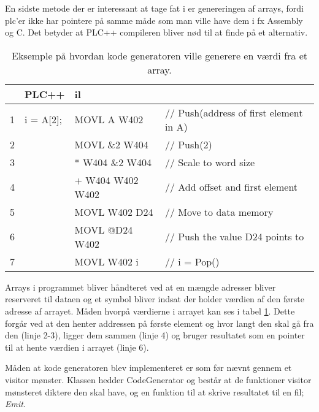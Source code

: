 {

En sidste metode der er interessant at tage fat i er genereringen af arrays, fordi \gls{plc}'er ikke har pointere på samme måde som man ville have dem i fx Assembly og C. Det betyder at PLC++ compileren bliver nød til at finde på et alternativ.

\begin{table}[h]
    \centering\ttfamily
    \begin{tabular}{l|l|l l}
         &PLC++       & \gls{il} \\\hline
        1&i = A[2];   & MOVL A W402       &// Push(address of first element in A)\\
        2&            & MOVL \&2 W404     &// Push(2)\\
        3&            & * W404 \&2 W404   &// Scale to word size\\
        4&            & + W404 W402 W402  &// Add offset and first element\\
        5&            & MOVL W402 D24     &// Move to data memory\\
        6&            & MOVL @D24 W402    &// Push the value D24 points to\\
        7&            & MOVL W402 i       &// i = Pop()
    \end{tabular}
    \caption{Eksemple på hvordan kode generatoren ville generere en værdi fra et array.}
    \label{tab:codegenArray}
\end{table}

Arrays i programmet bliver håndteret ved at en mængde adresser bliver reserveret til dataen og et symbol bliver indsat der holder værdien af den første adresse af arrayet. Måden hvorpå værdierne i arrayet kan ses i tabel \ref{tab:codegenArray}. Dette forgår ved at den henter addressen på første element og hvor langt den skal gå fra den (linje 2-3), ligger dem sammen (linje 4) og bruger resultatet som en pointer til at hente værdien i arrayet (linje 6).

Måden at kode generatoren blev implementeret er som før nævnt gennem et visitor mønster. Klassen hedder CodeGenerator og består at de funktioner visitor mønsteret diktere den skal have, og en funktion til at skrive resultatet til en fil; \textit{Emit}.

}
